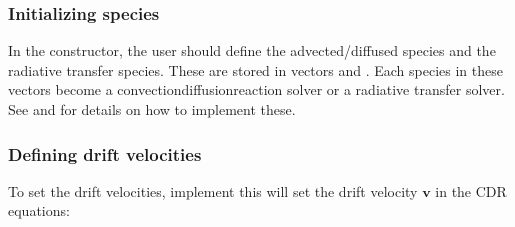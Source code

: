 \documentclass[letterpaper,10pt,english]{sphinxmanual}
\begin{document}
\subsubsection{Initializing species}
\label{\detokenize{Applications/CdrPlasmaModel:initializing-species}}
In the constructor, the user should define the advected/diffused species and the radiative transfer species.
These are stored in vectors  and .
Each species in these vectors become a convection\sphinxhyphen{}diffusion\sphinxhyphen{}reaction solver or a radiative transfer solver.
See {\hyperref[\detokenize{Solvers/CDR:chap-cdrspecies}]{}} and {\hyperref[\detokenize{Solvers/RTE:chap-rtspecies}]{}} for details on how to implement these.


\subsubsection{Defining drift velocities}
\label{\detokenize{Applications/CdrPlasmaModel:defining-drift-velocities}}
To set the drift velocities, implement  \textendash{} this will set the drift velocity \(\mathbf{v}\) in the CDR equations:

\begin{sphinxVerbatim}[commandchars=\\\{\},formatcom=\scriptsize]
           
                                                 
                                                 
                                                
     
\end{sphinxVerbatim}
\end{document}
